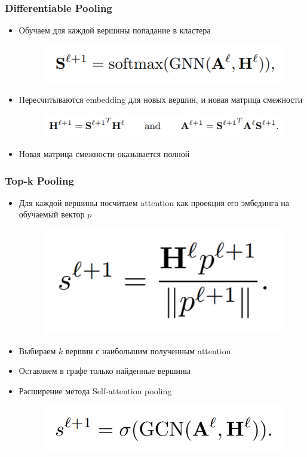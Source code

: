 \documentclass{beamer}
\begin{document}
\begin{frame}
\frametitle{Differentiable Pooling}
\begin{itemize}
	\item Обучаем для каждой вершины попадание в кластера
\begin{figure}
	\includegraphics[width=0.5\columnwidth]{softmax.png}
\end{figure}
	\item Пересчитываются embedding для новых вершин, и новая матрица смежности
	\begin{figure}
		\includegraphics[width=0.8\columnwidth]{differentaible_pooling.png}
	\end{figure}
	\item Новая матрица смежности оказывается полной
\end{itemize}
\end{frame}

\begin{frame}
\frametitle{Top-k Pooling}
\begin{itemize}
	\item Для каждой вершины посчитаем attention как проекция его эмбединга на обучаемый вектор $p$
	\begin{figure}
		\includegraphics[width=0.3\columnwidth]{top-k_pooing.png}
	\end{figure}
	\item Выбираем $k$ вершин с наибольшим полученным attention
	\item Оставляем в графе только найденные вершины
	\item Расширение метода Self-attention pooling
	\begin{figure}
		\includegraphics[width=0.5\columnwidth]{self-attention_pooing.png}
	\end{figure}
\end{itemize}
\end{frame}
\end{document}
